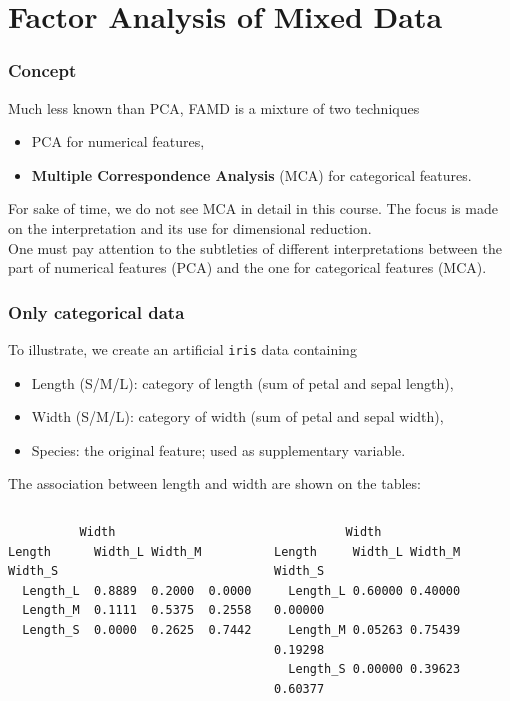 \section{Factor Analysis of Mixed Data}
\begin{frame}
\frametitle{Concept}
Much less known than PCA, FAMD is a mixture of two techniques
\begin{itemize}
\item PCA for numerical features,
\item {\bf Multiple Correspondence Analysis} (MCA) for categorical features.
\end{itemize}
For sake of time, we do not see MCA in detail in this course. The focus is made on the interpretation and its use for dimensional reduction. \\
\vspace{0.3cm}
One must pay attention to the subtleties of different interpretations between the part of numerical features (PCA) and the one for categorical features (MCA). 
\end{frame}
\begin{frame}[fragile]
\frametitle{Only categorical data}
To illustrate, we create an artificial {\tt iris} data containing
\begin{itemize}
\item Length (S/M/L): category of length (sum of petal and sepal length),
\item Width (S/M/L): category of width (sum of petal and sepal width),
\item Species: the original feature; used as supplementary variable.
\end{itemize}
The association between length and width are shown on the tables:\\
\scriptsize
\begin{columns}
\begin{column}{0.5\linewidth}
\begin{verbatim}
          Width
Length      Width_L Width_M Width_S
  Length_L  0.8889  0.2000  0.0000
  Length_M  0.1111  0.5375  0.2558
  Length_S  0.0000  0.2625  0.7442
\end{verbatim}
\end{column}
\vrule
\hspace{0.2cm}
\begin{column}{0.5\linewidth}
\begin{verbatim}
          Width
Length     Width_L Width_M Width_S
  Length_L 0.60000 0.40000 0.00000
  Length_M 0.05263 0.75439 0.19298
  Length_S 0.00000 0.39623 0.60377
\end{verbatim}
\end{column}
\end{columns}
\normalsize
\end{frame}
